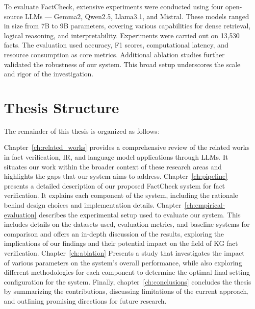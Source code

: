 
To evaluate FactCheck, extensive experiments were conducted using four open-source \ac{LLMs} — Gemma2, Qwen2.5, Llama3.1, and Mistral.
These models ranged in size from 7B to 9B parameters, covering various capabilities for dense retrieval, logical reasoning, and interpretability.
Experiments were carried out on 13,530 facts.
The evaluation used accuracy, F1 scores, computational latency, and resource consumption as core metrics.
Additional ablation studies further validated the robustness of our system.
This broad setup underscores the scale and rigor of the investigation.

\section{Thesis Structure}\label{sec:structure}
The remainder of this thesis is organized as follows:

Chapter~\ref{ch:related_works} provides a comprehensive review of the related works in fact verification, \ac{IR}, and language model applications through \ac{LLMs}.
It situates our work within the broader context of these research areas and highlights the gaps that our system aims to address.
Chapter~\ref{ch:pipeline} presents a detailed description of our proposed FactCheck system for fact verification.
It explains each component of the system, including the rationale behind design choices and implementation details.
Chapter~\ref{ch:empirical-evaluation} describes the experimental setup used to evaluate our system.
This includes details on the datasets used, evaluation metrics, and baseline systems for comparison and offers an in-depth discussion of the results, exploring the implications of our findings and their potential impact on the field of \ac{KG} fact verification.
Chapter~\ref{ch:ablation} Presents a study that investigates the impact of various parameters on the system's overall performance, while also exploring different methodologies for each component to determine the optimal final setting configuration for the system.
Finally, chapter~\ref{ch:conclusions} concludes the thesis by summarizing the contributions, discussing limitations of the current approach, and outlining promising directions for future research.

